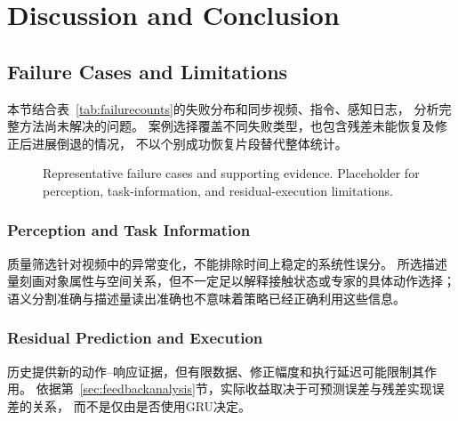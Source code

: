 \section{Discussion and Conclusion}
\label{sec:discussion}
\subsection{Failure Cases and Limitations}
\label{sec:failureanalysis}
本节结合表~\ref{tab:failurecounts}的失败分布和同步视频、指令、感知日志，
分析完整方法尚未解决的问题。
案例选择覆盖不同失败类型，也包含残差未能恢复及修正后进展倒退的情况，
不以个别成功恢复片段替代整体统计。

\begin{figure}[t]
\centering
{}
\caption{Representative failure cases and supporting evidence. Placeholder for perception, task-information, and residual-execution limitations.}
\label{fig:failurecases}
\end{figure}

\subsubsection{Perception and Task Information}
质量筛选针对视频中的异常变化，不能排除时间上稳定的系统性误分。
所选描述量刻画对象属性与空间关系，但不一定足以解释接触状态或专家的具体动作选择；
语义分割准确与描述量读出准确也不意味着策略已经正确利用这些信息。

\subsubsection{Residual Prediction and Execution}
历史提供新的动作--响应证据，但有限数据、修正幅度和执行延迟可能限制其作用。
依据第~\ref{sec:feedbackanalysis}节，实际收益取决于可预测误差与残差实现误差的关系，
而不是仅由是否使用GRU决定。

